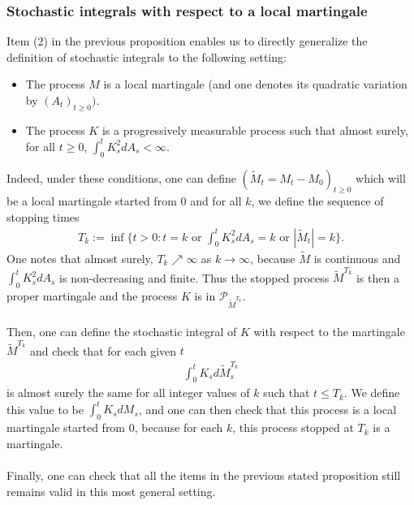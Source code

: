 \documentclass[../mainfile.tex]{subfiles}
\begin{document}
\subsubsection{Stochastic integrals with respect to a local martingale}
Item (2) in the previous proposition enables us to directly generalize the definition of stochastic integrals to the following setting:
\begin{itemize}
\item The process $M$ is a local martingale (and one denotes its quadratic variation by $(A_t)_{t \geq 0})$. 
\item The process $K$ is a progressively measurable process such that almost surely, for all $t \geq 0$, $\int_0^t K_s^2 dA_s < \infty$. 
\end{itemize}
Indeed, under these conditions, one can define $( \tilde{M}_t = M_t-M_0)_{t \geq 0}$ which will be a local martingale started from $0$ and for all $k$, we define the sequence of stopping times 
\begin{align*}
T_k:= \inf \{ t > 0: t=k \text{ or } \int_0^t K_s^2 dA_s = k \text{ or } |\tilde{M}_t| =k \}. 
\end{align*}
One notes that almost surely, $T_k \nearrow \infty$ as $k \to \infty$, because $\tilde{M}$ is continuous and $\int_0^t K_s^2 d A_s$ is non-decreasing and finite. Thus the stopped process $\tilde{M}^{T_k}$ is then a proper martingale and the process $K$ is in $\mathcal{P}_{\tilde{M}^{T_k}}$.
\\\\
Then, one can define the stochastic integral of $K$ with respect to the martingale $\tilde{M}^{T_k}$ and check that for each given $t$ 
\begin{align*}
\int_0^t K_s d \tilde{M}_s^{T_k}
\end{align*}
is almost surely the same for all integer values of $k$ such that $t \leq T_k$. We define this value to be $\int_0^t K_s dM_s$, and one can then check that this process is a local martingale started from $0$, because for each $k$, this process stopped at $T_k$ is a martingale. 
\\\\
Finally, one can check that all the items in the previous stated proposition still remains valid in this most general setting. 
\end{document}
